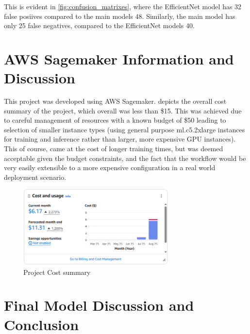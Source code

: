 This is evident in \cref{fig:confusion_matrixes}, where the EfficientNet model has 32 false posiives compared to the main models 48. Similarly, the main model has only 25 false negatives, compared to the EfficientNet models 40.

\section{AWS Sagemaker Information and Discussion}

This project was developed using AWS Sagemaker.  depicts the overall cost summary of the project, which overall was less than \$15. This was achieved due to careful management of resources with a known budget of \$50 leading to selection of smaller instance types (using general purpose ml.c5.2xlarge instances for training and inference rather than larger, more expensive GPU instances). This of course, came at the cost of longer training times, but was deemed acceptable given the budget constraints, and the fact that the workflow would be very easily extensible to a more expensive configuration in a real world deployment scenario.

\begin{figure}[h]
    \centering
    \includegraphics[width=300px]{figures/aws_cost_summary.png} %
    \centering
    \caption{Project Cost summary} %
    \label{fig:aws_cost_summary} %
\end{figure}






\section{Final Model Discussion and Conclusion}

